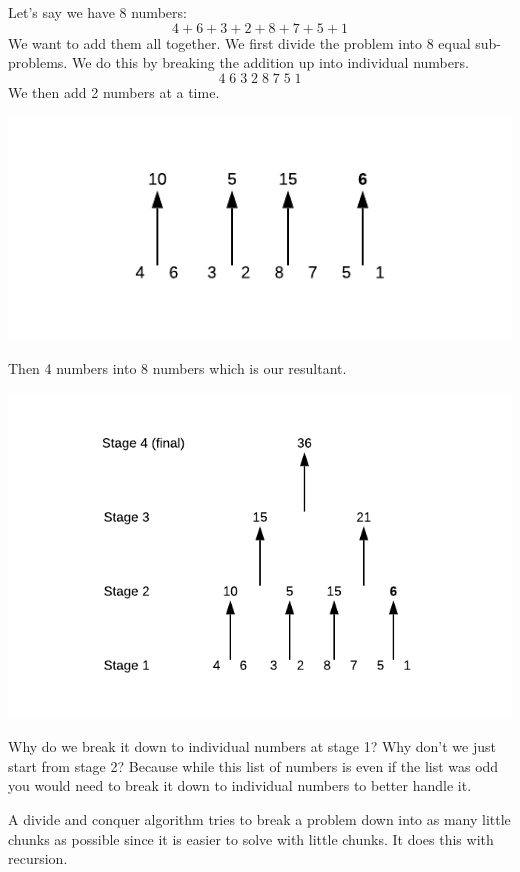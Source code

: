\documentclass{article}
\begin{document}
Let’s say we have 8 numbers:
$$4 + 6 + 3 + 2 + 8 + 7 + 5 + 1$$
We want to add them all together. We first divide the problem into 8 equal sub-problems. We do this by breaking the addition up into individual numbers.
$$4 \;6 \;3 \;2 \;8 \;7 \;5 \;1$$
We then add 2 numbers at a time.
\begin{center}
\includegraphics[width=\textwidth,height=\textheight,keepaspectratio]{b.png}
\end{center}
Then 4 numbers into 8 numbers which is our resultant.
\begin{center}
\includegraphics[width=\textwidth,height=\textheight,keepaspectratio]{c.png}
\end{center}
Why do we break it down to individual numbers at stage 1? Why don't we just start from stage 2? Because while this list of numbers is even if the list was odd you would need to break it down to individual numbers to better handle it.

A divide and conquer algorithm tries to break a problem down into as many little chunks as possible since it is easier to solve with little chunks. It does this with recursion.
\end{document}
